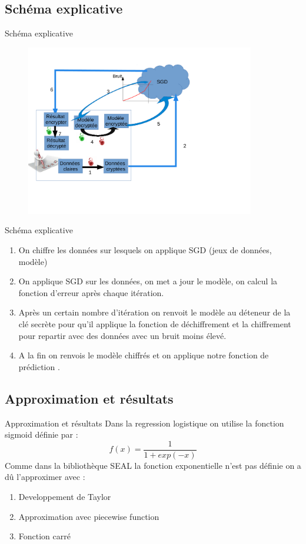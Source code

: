 \documentclass{beamer}
\begin{document}
\subsection{Schéma explicative}
  \begin{frame}{Schéma explicative}
             \begin{figure}[h!]\begin{center}
             \includegraphics[width=10cm]{SGD.pdf}
             \end{center}
             \end{figure}
        \end{frame}
  \begin{frame}{Schéma explicative}
        \begin{enumerate}
    		\item {On chiffre les données sur lesquels on applique SGD (jeux de données, modèle) }
  			\item {On applique SGD sur les données, on met a jour le modèle, on calcul la fonction d'erreur après chaque itération. }
  			\item {Après un certain nombre d'itération on renvoit le modèle au déteneur de la clé secrète pour qu'il applique la fonction de 			       déchiffrement et la chiffrement pour repartir avec des données avec un bruit moins élevé. }
    		\item { A la fin on renvois le modèle chiffrés et on applique notre fonction de prédiction .}
		\end{enumerate}
  \end{frame}

\subsection{Approximation et résultats}
 \begin{frame}{Approximation et résultats}
 Dans la regression logistique on utilise la fonction sigmoid définie par :\newline
 $$f(x)=\dfrac{1}{1 + exp(-x)}$$
 Comme dans la bibliothèque SEAL la fonction exponentielle n'est pas définie on a dû l'approximer avec :\newline
\begin{enumerate}
	\item{Developpement de Taylor}
	\item{Approximation avec piecewise function}
	\item{Fonction carré}
\end{enumerate}
\end{frame}
\end{document}
